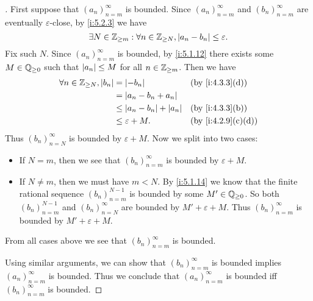 \begin{proof}[]
  First suppose that \((a_n)_{n = m}^\infty\) is bounded.
  Since \((a_n)_{n = m}^{\infty}\) and \((b_n)_{n = m}^{\infty}\) are eventually \(\varepsilon\)-close, by \cref{i:5.2.3} we have
  \[
    \exists N \in \mathbb{Z}_{\geq m} : \forall n \in \mathbb{Z}_{\geq N}, \left\lvert a_n - b_n\right\rvert \leq \varepsilon.
  \]
  Fix such \(N\).
  Since \((a_n)_{n = m}^\infty\) is bounded, by \cref{i:5.1.12} there exists some \(M \in \mathbb{Q}_{\geq 0}\) such that \(\left\lvert a_n\right\rvert \leq M\) for all \(n \in \mathbb{Z}_{\geq m}\).
  Then we have
  \begin{align*}
    \forall n \in \Z_{\geq N}, \abs{b_n} & = \abs{-b_n}                     &  & \by{i:4.3.3}[d]   \\
                                         & = \abs{a_n - b_n + a_n}                                 \\
                                         & \leq \abs{a_n - b_n} + \abs{a_n} &  & \by{i:4.3.3}[b]   \\
                                         & \leq \varepsilon + M.            &  & \by{i:4.2.9}[c,d]
  \end{align*}
  Thus \((b_n)_{n = N}^\infty\) is bounded by \(\varepsilon + M\).
  Now we split into two cases:
  \begin{itemize}
    \item If \(N = m\), then we see that \((b_n)_{n = m}^\infty\) is bounded by \(\varepsilon + M\).
    \item If \(N \neq m\), then we must have \(m < N\).
          By \cref{i:5.1.14} we know that the finite rational sequence \((b_n)_{n = m}^{N - 1}\) is bounded by some \(M' \in \mathbb{Q}_{\geq 0}\).
          So both \((b_n)_{n = m}^{N - 1}\) and \((b_n)_{n = N}^\infty\) are bounded by \(M' + \varepsilon + M\).
          Thus \((b_n)_{n = m}^\infty\) is bounded by \(M' + \varepsilon + M\).
  \end{itemize}
  From all cases above we see that \((b_n)_{n = m}^\infty\) is bounded.

  Using similar arguments, we can show that \((b_n)_{n = m}^\infty\) is bounded implies \((a_n)_{n = m}^\infty\) is bounded.
  Thus we conclude that \((a_n)_{n = m}^\infty\) is bounded iff \((b_n)_{n = m}^\infty\) is bounded.
\end{proof}
